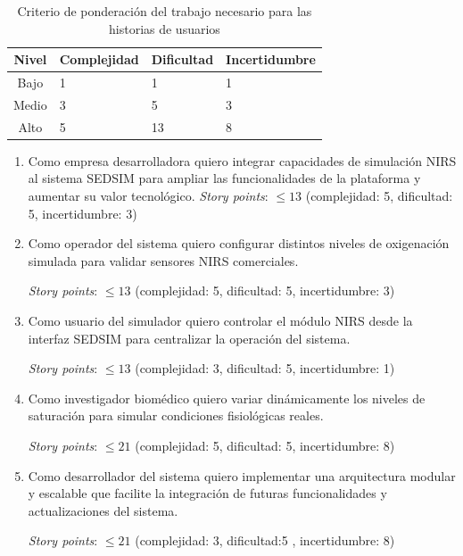 \documentclass[
11pt, %
]{charter}
\begin{document}
\begin{table}[ht]
\centering
\caption{Criterio de ponderación del trabajo necesario para las historias de usuarios}
\label{tab:interesados}

\begin{tabularx}{\linewidth}{@{}|c|Y|Y|Y|@{}}
\hline

Nivel & Complejidad & Dificultad & Incertidumbre \\ \hline

Bajo  & 1 & 1  & 1 \\ \hline

Medio & 3 & 5  & 3 \\ \hline

Alto  & 5 & 13 & 8 \\ \hline

\end{tabularx}

\end{table}

\begin{enumerate}

\item Como empresa desarrolladora quiero integrar capacidades de simulación NIRS al sistema SEDSIM para ampliar las funcionalidades de la plataforma y aumentar su valor tecnológico.
\textit{Story points}:  $ \leq 13$  (complejidad: 5, dificultad: 5, incertidumbre: 3)

\vspace{0.3cm}

\item Como operador del sistema quiero configurar distintos niveles de oxigenación simulada para validar sensores NIRS comerciales.

\textit{Story points}: $ \leq 13$  (complejidad: 5, dificultad: 5, incertidumbre: 3)

\vspace{0.3cm}

\item Como usuario del simulador quiero controlar el módulo NIRS desde la interfaz SEDSIM para centralizar la operación del sistema.

\textit{Story points}: $ \leq 13$  (complejidad: 3, dificultad: 5, incertidumbre: 1)

\vspace{0.3cm}

\item Como investigador biomédico quiero variar dinámicamente los niveles de saturación para simular condiciones fisiológicas reales.

\textit{Story points}:  $ \leq 21$  (complejidad: 5, dificultad: 5, incertidumbre: 8)

\item Como desarrollador del sistema quiero implementar una arquitectura modular y escalable que facilite la integración de futuras funcionalidades y actualizaciones del sistema.

\textit{Story points}:  $ \leq 21$  (complejidad: 3, dificultad:5 , incertidumbre: 8)

\end{enumerate}
\end{document}

